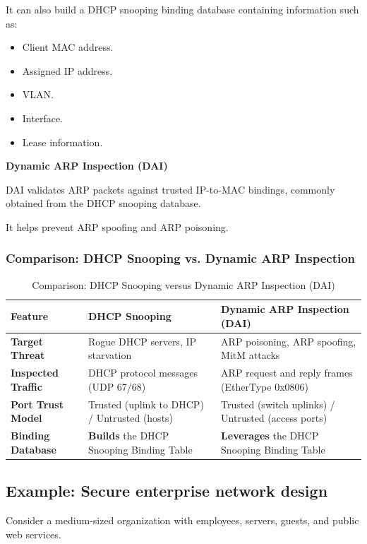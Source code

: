 It can also build a DHCP snooping binding database containing information such as:

\begin{itemize}
\item Client MAC address.
\item Assigned IP address.
\item VLAN.
\item Interface.
\item Lease information.
\end{itemize}

\textbf{Dynamic ARP Inspection (DAI)}

DAI validates ARP packets against trusted IP-to-MAC bindings, commonly obtained from the DHCP snooping database.

It helps prevent ARP spoofing and ARP poisoning.

\subsubsection{Comparison: DHCP Snooping vs. Dynamic ARP Inspection}
\begin{table}[htbp]
\centering
\caption{Comparison: DHCP Snooping versus Dynamic ARP Inspection (DAI)}
\label{tab:dhcp_snoop_vs_dai}
\begin{tabularx}{\textwidth}{p{3.8cm} X X}
\toprule
\textbf{Feature} & \textbf{DHCP Snooping} & \textbf{Dynamic ARP Inspection (DAI)} \\
\midrule
\textbf{Target Threat} & Rogue DHCP servers, IP starvation & ARP poisoning, ARP spoofing, MitM attacks \\
\textbf{Inspected Traffic} & DHCP protocol messages (UDP 67/68) & ARP request and reply frames (EtherType 0x0806) \\
\textbf{Port Trust Model} & Trusted (uplink to DHCP) / Untrusted (hosts) & Trusted (switch uplinks) / Untrusted (access ports) \\
\textbf{Binding Database} & \textbf{Builds} the DHCP Snooping Binding Table & \textbf{Leverages} the DHCP Snooping Binding Table \\
\bottomrule
\end{tabularx}
\end{table}


\subsection{Example: Secure enterprise network design}

Consider a medium-sized organization with employees, servers, guests, and public web services.

